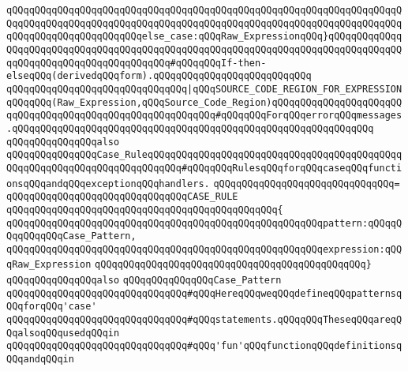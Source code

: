 \verb|qQQqqQQqqQQqqQQqqQQqqQQqqQQqqQQqqQQqqQQqqQQqqQQqqQQqqQQqqQQqqQQqqQQqqQQqqQQqqQQqqQQqqQQqqQQqqQQqqQQqqQQqqQQqqQQqqQQqqQQqqQQqqQQqqQQqqQQqqQQqqQQqqQQqqQQqqQQqqQQqqQQqelse_case:qQQqRaw_ExpressionqQQq}qQQqqQQqqQQqqQQqqQQqqQQqqQQqqQQqqQQqqQQqqQQqqQQqqQQqqQQqqQQqqQQqqQQqqQQqqQQqqQQqqQQqqQQqqQQqqQQqqQQqqQQqqQQqqQQq#qQQqqQQqIf-then-elseqQQq(derivedqQQqform).qQQqqQQqqQQqqQQqqQQqqQQqqQQq|\newline
\verb|qQQqqQQqqQQqqQQqqQQqqQQqqQQqqQQq|\verb#|qQQqSOURCE_CODE_REGION_FOR_EXPRESSIONqQQqqQQq(Raw_Expression,qQQqSource_Code_Region)qQQqqQQqqQQqqQQqqQQqqQQqqQQqqQQqqQQqqQQqqQQqqQQqqQQqqQQqqQQq#\verb|#qQQqqQQqForqQQqerrorqQQqmessages.qQQqqQQqqQQqqQQqqQQqqQQqqQQqqQQqqQQqqQQqqQQqqQQqqQQqqQQqqQQqqQQq|\newline
\newline
\newline
\newline
\verb|qQQqqQQqqQQqqQQqalso|\newline
\verb|qQQqqQQqqQQqqQQqCase_RuleqQQqqQQqqQQqqQQqqQQqqQQqqQQqqQQqqQQqqQQqqQQqqQQqqQQqqQQqqQQqqQQqqQQqqQQqqQQq#qQQqqQQqRulesqQQqforqQQqcaseqQQqfunctionsqQQqandqQQqexceptionqQQqhandlers.|\newline
\verb|qQQqqQQqqQQqqQQqqQQqqQQqqQQqqQQq=|\newline
\verb|qQQqqQQqqQQqqQQqqQQqqQQqqQQqqQQqCASE_RULE|\newline
\verb|qQQqqQQqqQQqqQQqqQQqqQQqqQQqqQQqqQQqqQQqqQQqqQQq{|\newline
\verb|qQQqqQQqqQQqqQQqqQQqqQQqqQQqqQQqqQQqqQQqqQQqqQQqqQQqqQQqpattern:qQQqqQQqqQQqqQQqCase_Pattern,|\newline
\verb|qQQqqQQqqQQqqQQqqQQqqQQqqQQqqQQqqQQqqQQqqQQqqQQqqQQqqQQqexpression:qQQqRaw_Expression|\newline
\verb|qQQqqQQqqQQqqQQqqQQqqQQqqQQqqQQqqQQqqQQqqQQqqQQq}|\newline
\newline
\newline
\newline
\verb|qQQqqQQqqQQqqQQqalso|\newline
\verb|qQQqqQQqqQQqqQQqCase_Pattern|\newline
\newline
\verb|qQQqqQQqqQQqqQQqqQQqqQQqqQQqqQQq#qQQqHereqQQqweqQQqdefineqQQqpatternsqQQqforqQQq'case'|\newline
\verb|qQQqqQQqqQQqqQQqqQQqqQQqqQQqqQQq#qQQqstatements.qQQqqQQqTheseqQQqareqQQqalsoqQQqusedqQQqin|\newline
\verb|qQQqqQQqqQQqqQQqqQQqqQQqqQQqqQQq#qQQq'fun'qQQqfunctionqQQqdefinitionsqQQqandqQQqin|\newline
